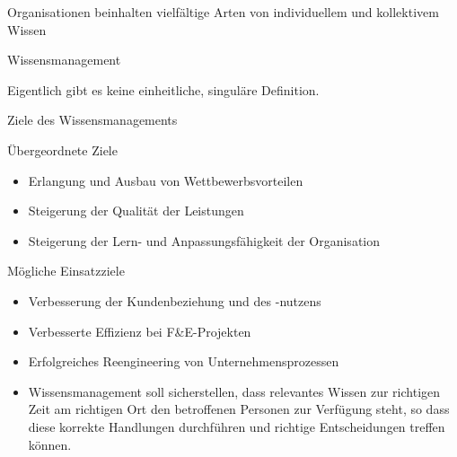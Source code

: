 \documentclass[aspectratio=1610,onlymath]{beamer}
\begin{document}
\begin{frame}{Organisationen beinhalten vielfältige Arten von individuellem und kollektivem Wissen}


\end{frame}


\begin{frame}{Wissensmanagement}


Eigentlich gibt es keine einheitliche, singuläre Definition.

\bigskip
Ziele des Wissensmanagements

\begin{footnotesize}

\alert{Übergeordnete Ziele}
\begin{itemize}
	\item Erlangung und Ausbau von Wettbewerbsvorteilen
	\item Steigerung der Qualität der Leistungen	
	\item Steigerung der Lern- und Anpassungsfähigkeit der Organisation
\end{itemize}
\alert{Mögliche Einsatzziele}
\begin{itemize}
	\item Verbesserung der Kundenbeziehung und des -nutzens
	\item Verbesserte Effizienz bei F\&E-Projekten
	\item Erfolgreiches Reengineering von Unternehmensprozessen
\end{itemize}
\end{footnotesize}

\begin{itemize}
	\item[] Wissensmanagement soll sicherstellen, dass relevantes Wissen zur richtigen Zeit am richtigen Ort den betroffenen Personen zur Verfügung steht, so dass diese korrekte Handlungen durchführen und richtige Entscheidungen treffen können. 
\end{itemize}

\end{frame}
\end{document}
